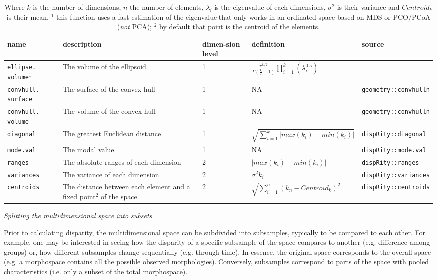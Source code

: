 \documentclass[12pt,letterpaper]{article}
\renewcommand{\subsection}[1]{%
\bigskip
\begin{center}
\begin{large}
\normalfont\itshape #1
\end{large}
\end{center}}
\begin{document}
\begin{table}
\resizebox{\textwidth}{!}
{%
    \begin{tabular}{p{2cm}|p{5cm}|p{1cm}|p{5cm}|p{5cm}}
        name & description & dimen-sion level & definition & source \\
        \hline
        \texttt{ellipse. volume}$^1$ & The volume of the ellipsoid & 1 & $\frac{\pi^{k/2}}{\Gamma(\frac{k}{2}+1)}\displaystyle\prod_{i=1}^{k} (\lambda_{i}^{0.5})$ & \cite{DonohueDim}\\
        \texttt{convhull. surface} & The surface of the convex hull & 1 & NA & \texttt{geometry::convhulln} \\
        \texttt{convhull. volume} & The volume of the convex hull & 1 & NA & \texttt{geometry::convhulln} \\
        \texttt{diagonal} & The greatest Euclidean distance & 1 & $\sqrt{\sum_{i=1}^{k}|max(k_i) - min(k_i)|}$ & \texttt{dispRity::diagonal} \\
        \texttt{mode.val} & The modal value & 1 & NA & \texttt{dispRity::mode.val}\\
        \texttt{ranges} & The absolute ranges of each dimension & 2 & $|max(k_i) - min(k_i)|$ & \texttt{dispRity::ranges} \\
        \texttt{variances} & The variance of each dimension & 2 & $\sigma^{2}{k_i}$ & \texttt{dispRity::variances} \\
        \texttt{centroids} & The distance between each element and a fixed point$^2$ of the space & 2 & $\sqrt{\sum_{i=1}^{n}{({k}_{n}-Centroid_{k})^2}}$ & \texttt{dispRity::centroids} \\
    \end{tabular}
}%
    \caption{\small{Where $k$ is the number of dimensions, $n$ the number of elements, $\lambda_i$ is the eigenvalue of each dimensions, $\sigma^{2}$ is their variance and $Centroid_{k}$ is their mean. $^1$ this function uses a fast estimation of the eigenvalue that only works in an ordinated space based on MDS or PCO/PCoA (\textit{not} PCA); $^2$ by default that point is the centroid of the elements.}}
    \label{Tab:metrics}
\end{table}

\subsection{Splitting the multidimensional space into subsets}
Prior to calculating disparity, the multidimensional space can be subdivided into subsamples, typically to be compared to each other.
For example, one may be interested in seeing how the disparity of a specific subsample of the space compares to another (e.g. difference among groups) or, how different subsamples change sequentially (e.g. through time).
In essence, the original space corresponds to the overall space (e.g. a morphospace contains all the possible observed morphologies).
Conversely, subsamples correspond to parts of the space with pooled characteristics (i.e. only a subset of the total morphospace).
\end{document}
